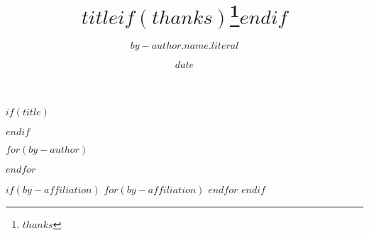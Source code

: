 $if(title)$
\title{$title$$if(thanks)$\thanks{$thanks$}$endif$}
$endif$

$for(by-author)$
  \author[$if(it.metadata.affil-id)$$it.metadata.affil-id$$endif$]{$by-author.name.literal$}
$endfor$

$if(by-affiliation)$
  $for(by-affiliation)$
  $endfor$
$endif$

\date{$date$}